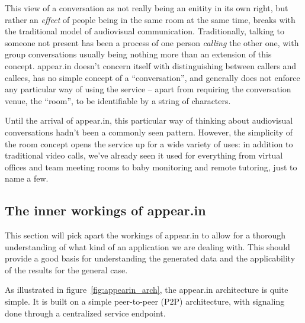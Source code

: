     This view of a conversation as not really being an enitity in its own right, but rather an \emph{effect} of people being in the same room at the same time, breaks with the traditional model of audiovisual communication. Traditionally, talking to someone not present has been a process of one person \emph{calling} the other one, with group conversations usually being nothing more than an extension of this concept. appear.in doesn't concern itself with distinguishing between callers and callees, has no simple concept of a ``conversation'', and generally does not enforce any particular way of using the service -- apart from requiring the conversation venue, the ``room'', to be identifiable by a string of characters.

    Until the arrival of appear.in, this particular way of thinking about audiovisual conversations hadn't been a commonly seen pattern. However, the simplicity of the room concept opens the service up for a wide variety of uses: in addition to traditional video calls, we've already seen it used for everything from virtual offices and team meeting rooms to baby monitoring and remote tutoring, just to name a few.

  \subsection{The inner workings of appear.in}
  \label{survey:appearin_details}

  This section will pick apart the workings of appear.in to allow for a thorough understanding of what kind of an application we are dealing with. This should provide a good basis for understanding the generated data and the applicability of the results for the general case.

    As illustrated in figure~\ref{fig:appearin_arch}, the appear.in architecture is quite simple. It is built on a simple peer-to-peer (P2P) architecture, with signaling done through a centralized service endpoint.


